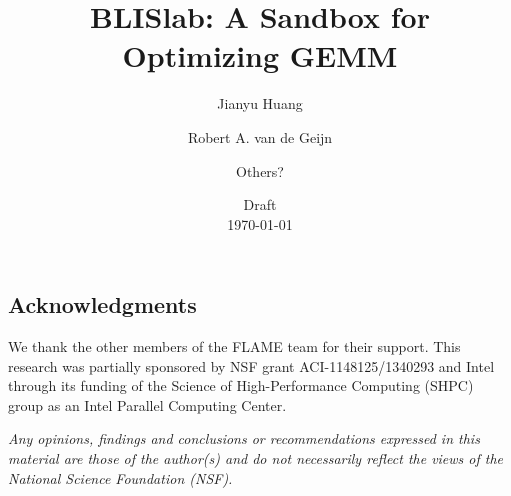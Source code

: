 \documentclass{article}
\begin{document}
\title{
BLISlab: A Sandbox for Optimizing GEMM
}

\author{
Jianyu Huang
\and
Robert A. van de Geijn
\and
Others?
}

\date{Draft \\ \today}

\maketitle 

\begin{abstract}

\end{abstract}





\subsection*{Acknowledgments}
We thank the other members of the FLAME team for their support.
This research was partially sponsored by NSF grant ACI-1148125/1340293 and Intel through its funding of the Science of High-Performance Computing (SHPC) group as an Intel Parallel Computing Center.

{\em Any opinions, findings and conclusions or recommendations
expressed in this material are those of the author(s) and do not
necessarily reflect the views of the National Science Foundation
(NSF).}


 

\end{document}
